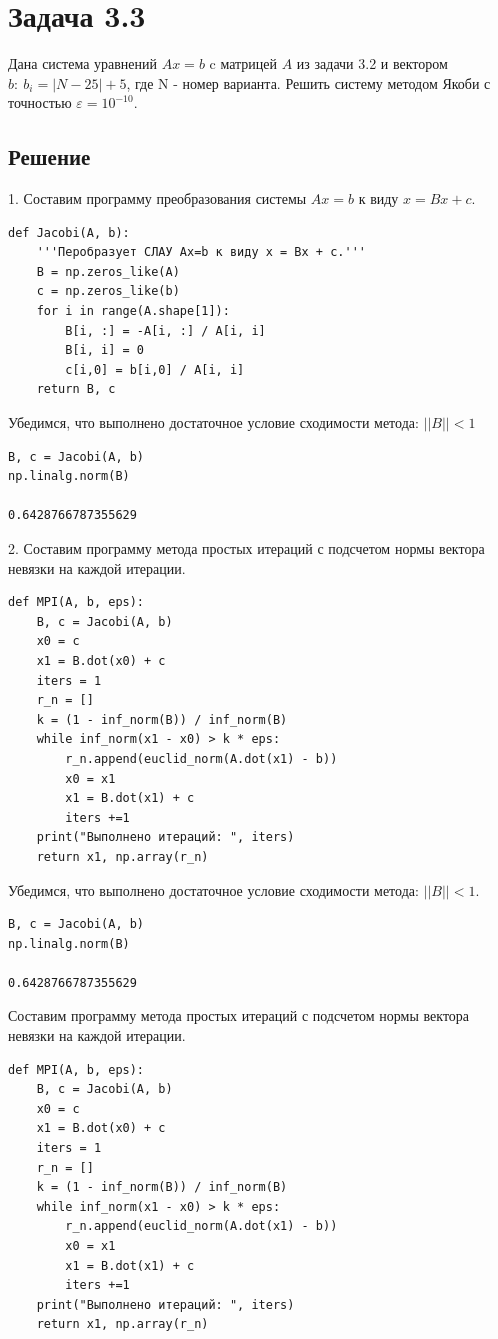 \section*{Задача 3.3}
Дана система уравнений $Ax = b$ c матрицей $A$ из задачи 3.2 и вектором $b:\ b_i = |N - 25| + 5$, где N - номер варианта. Решить систему методом Якоби с точностью $\varepsilon = 10^{-10}$.

\subsection*{Решение}
1. Составим программу преобразования системы $Ax = b$ к виду $x = Bx + c$.

\begin{verbatim}
def Jacobi(A, b):
    '''Перобразует СЛАУ Ax=b к виду x = Bx + c.'''
    B = np.zeros_like(A)
    c = np.zeros_like(b)
    for i in range(A.shape[1]):
        B[i, :] = -A[i, :] / A[i, i]
        B[i, i] = 0
        c[i,0] = b[i,0] / A[i, i]
    return B, c
\end{verbatim}

Убедимся, что выполнено достаточное условие сходимости метода: $||B|| < 1$
\begin{verbatim}
B, c = Jacobi(A, b)
np.linalg.norm(B)

0.6428766787355629
\end{verbatim}

2. Составим программу метода простых итераций с подсчетом нормы вектора невязки на каждой итерации.
\begin{verbatim}
def MPI(A, b, eps):
    B, c = Jacobi(A, b)
    x0 = c
    x1 = B.dot(x0) + c
    iters = 1
    r_n = []
    k = (1 - inf_norm(B)) / inf_norm(B)
    while inf_norm(x1 - x0) > k * eps:
        r_n.append(euclid_norm(A.dot(x1) - b))
        x0 = x1
        x1 = B.dot(x1) + c
        iters +=1
    print("Выполнено итераций: ", iters)
    return x1, np.array(r_n)
\end{verbatim}

Убедимся, что выполнено достаточное условие сходимости метода: $||B|| < 1$.
\begin{verbatim}
B, c = Jacobi(A, b)
np.linalg.norm(B)

0.6428766787355629
\end{verbatim}

Составим программу метода простых итераций с подсчетом нормы вектора невязки на каждой итерации.
\begin{verbatim}
def MPI(A, b, eps):
    B, c = Jacobi(A, b)
    x0 = c
    x1 = B.dot(x0) + c
    iters = 1
    r_n = []
    k = (1 - inf_norm(B)) / inf_norm(B)
    while inf_norm(x1 - x0) > k * eps:
        r_n.append(euclid_norm(A.dot(x1) - b))
        x0 = x1
        x1 = B.dot(x1) + c
        iters +=1
    print("Выполнено итераций: ", iters)
    return x1, np.array(r_n)
\end{verbatim}

